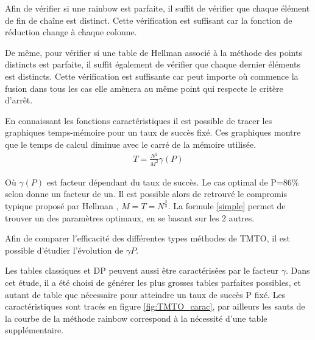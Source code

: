 	\bigskip
	
	Afin de vérifier si une \gls{rainbow} est parfaite, il suffit de vérifier que chaque élément de fin de chaîne est distinct. Cette vérification est suffisant car la fonction de réduction change à chaque colonne.
	
	\bigskip

	De même, pour vérifier si une table de Hellman associé à la méthode des points distincts est parfaite, il suffit également de vérifier que chaque dernier éléments est distincts. Cette vérification est suffisante car peut importe où commence la fusion dans tous les cas elle amènera au même point qui respecte le critère d'arrêt.

	En connaissant les fonctions caractéristiques il est possible de tracer les graphiques temps-mémoire pour un taux de succès fixé. Ces graphiques montre que le temps de calcul diminue avec le carré de la mémoire utilisée.
\begin{align*}
	\label{simple}
	T=\frac{N^2}{M^2}\gamma(P)
\end{align*}
	
	Où $\gamma(P)$ est facteur dépendant du taux de succès. Le cas optimal de P=86\% selon \cite{checkpoints} donne un facteur de un. Il est possible alors de retrouvé le compromis typique proposé par Hellman \cite{ehellman}, $M=T=N^{\frac{2}{3}}$. La formule \ref{simple} permet de trouver un des paramètres optimaux, en se basant sur les 2 autres.

	Afin de comparer l'efficacité des différentes types méthodes de \gls{TMTO}, il est possible d'étudier l'évolution de $\gamma{P}$.
	
	Les tables classiques et DP peuvent aussi être caractérisées par le facteur $\gamma$. Dans cet étude, il a été choisi de générer les plus grosses tables parfaites possibles, et autant de table que nécessaire pour atteindre un taux de succès P fixé. Les caractéristiques sont tracés en figure \ref{fig:TMTO_carac}, par ailleurs les sauts de la courbe de la méthode \gls{rainbow} correspond à la nécessité d'une table supplémentaire.

